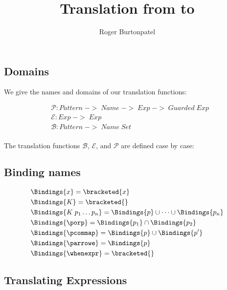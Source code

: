 \documentclass[]{article}
\title{Translation from {\PPlus} to {\VMinus}}
\author{Roger Burtonpatel}
\begin{document}
\maketitle

\subsection{Domains}
We give the names and domains of our translation functions: 

\begin{align*}
    &\mathcal{P}: Pattern\; ->\; Name\; ->\; Exp\; ->\; Guarded\; Exp \\
    &\mathcal{E}: Exp\; ->\; Exp \\
    &\mathcal{B}: Pattern\; ->\; Name\; Set \\
    \end{align*}

The translation functions $\mathcal{B}$, $\mathcal{E}$, and $\mathcal{P}$
are defined case by case: 

\subsection{Binding names}

\begin{align*}
    &\Bindings{x} = \bracketed{x} \\ 
    &\Bindings{K} = \bracketed{} \\
    &\Bindings{K\; p_{1} \dots p_{n}} = \Bindings{p} \cup \dots \cup \Bindings{p_{n}} \\
    &\Bindings{\porp} = \Bindings{p_{1}} \cap \Bindings{p_{2}} \\
    &\Bindings{\pcommap} = \Bindings{p} \cup \Bindings{p'} \\
    &\Bindings{\parrowe} = \Bindings{p} \\
    &\Bindings{\whenexpr} = \bracketed{}
\end{align*}

\subsection{Translating Expressions}
\end{document}

